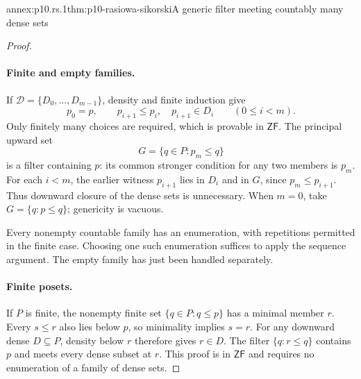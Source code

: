 \begin{annexitem}{annex:p10.rs.1}{thm:p10-rasiowa-sikorski}{A generic filter meeting countably many dense sets}
\begin{proof}
\paragraph{Finite and empty families.}
If \(\mathcal D=\{D_0,\ldots,D_{m-1}\}\), density and finite
induction give
\[
 p_0=p,\qquad p_{i+1}\leq p_i,\quad p_{i+1}\in D_i
                   \qquad(0\leq i<m).
\]
Only finitely many choices are required, which is provable in
\(\mathsf{ZF}\).
The principal upward set
\[
 G=\{q\in P:p_m\leq q\}
\]
is a filter containing \(p\): its common stronger condition for
any two members is \(p_m\).
For each \(i<m\), the earlier witness \(p_{i+1}\) lies in
\(D_i\) and in \(G\), since \(p_m\leq p_{i+1}\).
Thus downward closure of the dense sets is unnecessary.
When \(m=0\), take \(G=\{q:p\leq q\}\); genericity is vacuous.

Every nonempty countable family has an enumeration, with repetitions
permitted in the finite case. Choosing one such enumeration suffices
to apply the sequence argument. The empty family has just been
handled separately.

\paragraph{Finite posets.}
If \(P\) is finite, the nonempty finite set
\(\{q\in P:q\leq p\}\) has a minimal member \(r\).
Every \(s\leq r\) also lies below \(p\), so minimality implies
\(s=r\).
For any downward dense \(D\subseteq P\), density below \(r\)
therefore gives \(r\in D\).
The filter \(\{q:r\leq q\}\) contains \(p\) and meets every
dense subset at \(r\).  This proof is in \(\mathsf{ZF}\) and
requires no enumeration of a family of dense sets.
\end{proof}
\end{annexitem}
